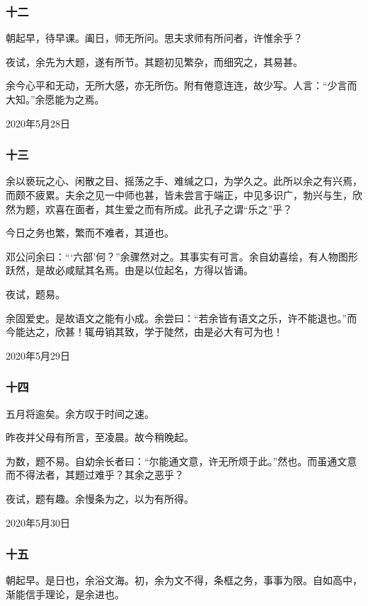 \documentclass[a5paper]{ctexart}
\begin{document}
	\subsubsection{十二}
	朝起早，待早课。阖日，师无所问。思夫求师有所问者，许惟余乎？
	
	夜试，余先为大题，遂有所节。其题初见繁杂，而细究之，其易甚。
	
	余今心平和无动，无所大感，亦无所伤。附有倦意连连，故少写。人言：“少言而大知。”余愿能为之焉。
	\begin{flushright}
		2020年5月28日
	\end{flushright}
	
	\subsubsection{十三}
	余以亵玩之心、闲散之目、摇荡之手、难缄之口，为学久之。此所以余之有兴焉，而颇不疲累。夫余之见一中师也甚，皆未尝言于端正，中见多识广，勃兴与生，欣然为题，欢喜在面者，其生爱之而有所成。此孔子之谓“乐之”乎？
	
	今日之务也繁，繁而不难者，其道也。
	
	邓公问余曰：“‘六部’何？”余骤然对之。其事实有可言。余自幼喜绘，有人物图形跃然，是故必咸赋其名焉。由是以位起名，方得以皆诵。
	
	夜试，题易。
	
	余固爱史。是故语文之能有小成。余尝曰：“若余皆有语文之乐，许不能退也。”而今能达之，欣甚！辄毋销其致，学于陡然，由是必大有可为也！
	\begin{flushright}
		2020年5月29日
	\end{flushright}
	
	\subsubsection{十四}
	五月将逾矣。余方叹于时间之速。
	
	昨夜并父母有所言，至凌晨。故今稍晚起。
	
	为数，题不易。自幼余长者曰：“尔能通文意，许无所烦于此。”然也。而虽通文意而不得法者，其题过难乎？其余之恶乎？
	
	夜试，题有趣。余慢条为之，以为有所得。
	\begin{flushright}
		2020年5月30日
	\end{flushright}
	
	\subsubsection{十五}
	朝起早。是日也，余浴文海。初，余为文不得，条框之务，事事为限。自如高中，渐能信手理论，是余进也。
	
\end{document}
